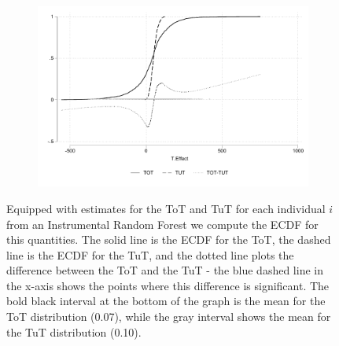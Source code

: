\begin{figure}[H]
     \caption{ToT-TuT CDF}
     \label{tot_tut_ecdf}
    \begin{center}
    \begin{subfigure}{0.6\textwidth}
        \centering
        \includegraphics[width=\textwidth]{Figuras/cdf_tot_tut.pdf}
    \end{subfigure}
    \end{center}
    \scriptsize
       Equipped with estimates for the ToT and TuT for each individual $i$ from an Instrumental Random Forest we compute the ECDF for this quantities. The solid line is the ECDF for the ToT, the dashed line is the ECDF for the TuT, and the dotted line plots the difference between the ToT and the TuT - the blue dashed line in the x-axis shows the points where this difference is significant. The bold black interval at the bottom of the graph is the mean for the ToT distribution (0.07), while the gray interval shows the mean for the TuT distribution (0.10).
       
\end{figure}

